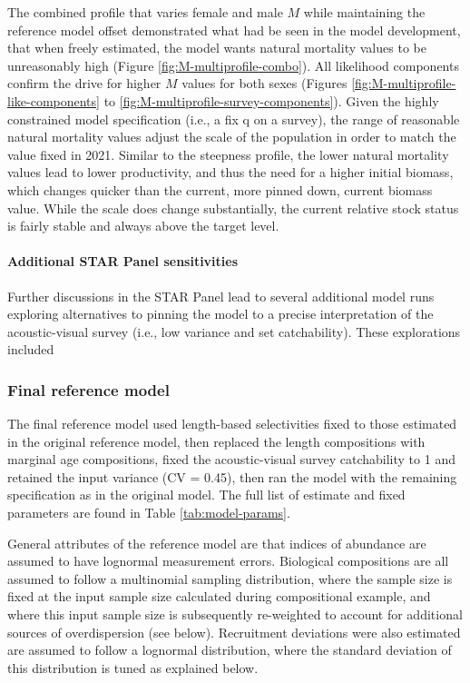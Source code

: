 \documentclass[11pt,
  english,
  letterpaper,
]{article}
\begin{document}
The combined profile that varies female and male \(M\) while maintaining the reference model offset demonstrated what had be seen in the model development, that when freely estimated, the model wants natural mortality values to be unreasonably high (Figure \ref{fig:M-multiprofile-combo}). All likelihood components confirm the drive for higher \(M\) values for both sexes (Figures \ref{fig:M-multiprofile-like-components} to \ref{fig:M-multiprofile-survey-components}). Given the highly constrained model specification (i.e., a fix q on a survey), the range of reasonable natural mortality values adjust the scale of the population in order to match the value fixed in 2021. Similar to the steepness profile, the lower natural mortality values lead to lower productivity, and thus the need for a higher initial biomass, which changes quicker than the current, more pinned down, current biomass value. While the scale does change substantially, the current relative stock status is fairly stable and always above the target level.

\hypertarget{additional-star-panel-sensitivities}{%
\paragraph{Additional STAR Panel sensitivities}\label{additional-star-panel-sensitivities}}

Further discussions in the STAR Panel lead to several additional model runs exploring alternatives to pinning the model to a precise interpretation of the acoustic-visual survey (i.e., low variance and set catchability). These explorations included

\hypertarget{final-reference-model}{%
\subsubsection{Final reference model}\label{final-reference-model}}

The final reference model used length-based selectivities fixed to those estimated in the original reference model, then replaced the length compositions with marginal age compositions, fixed the acoustic-visual survey catchability to 1 and retained the input variance (CV = 0.45), then ran the model with the remaining specification as in the original model. The full list of estimate and fixed parameters are found in Table \ref{tab:model-params}.

General attributes of the reference model are that indices of abundance are assumed to have lognormal measurement errors. Biological compositions are all assumed to follow a multinomial sampling distribution, where the sample size is fixed at the input sample size calculated during compositional example, and where this input sample size is subsequently re-weighted to account for additional sources of overdispersion (see below). Recruitment deviations were also estimated are assumed to follow a lognormal distribution, where the standard deviation of this distribution is tuned as explained below.
\end{document}
